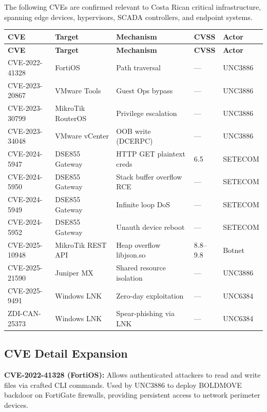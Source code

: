 \documentclass[11pt,a4paper]{article}
\begin{document}
The following CVEs are confirmed relevant to Costa Rican critical infrastructure, spanning edge devices, hypervisors, SCADA controllers, and endpoint systems.

\begin{longtable}{@{} p{2.5cm} p{2.2cm} p{4cm} p{1.5cm} p{2cm} @{}}
\toprule
\textbf{CVE} & \textbf{Target} & \textbf{Mechanism} & \textbf{CVSS} & \textbf{Actor} \\
\midrule
\endfirsthead
\toprule
\textbf{CVE} & \textbf{Target} & \textbf{Mechanism} & \textbf{CVSS} & \textbf{Actor} \\
\midrule
\endhead
CVE-2022-41328 & FortiOS & Path traversal & --- & UNC3886 \\
CVE-2023-20867 & VMware Tools & Guest Ops bypass & --- & UNC3886 \\
CVE-2023-30799 & MikroTik RouterOS & Privilege escalation & --- & UNC3886 \\
CVE-2023-34048 & VMware vCenter & OOB write (DCERPC) & --- & UNC3886 \\
CVE-2024-5947 & DSE855 Gateway & HTTP GET plaintext creds & 6.5 & SETECOM \\
CVE-2024-5950 & DSE855 Gateway & Stack buffer overflow RCE & --- & SETECOM \\
CVE-2024-5949 & DSE855 Gateway & Infinite loop DoS & --- & SETECOM \\
CVE-2024-5952 & DSE855 Gateway & Unauth device reboot & --- & SETECOM \\
CVE-2025-10948 & MikroTik REST API & Heap overflow libjson.so & 8.8--9.8 & Botnet \\
CVE-2025-21590 & Juniper MX & Shared resource isolation & --- & UNC3886 \\
CVE-2025-9491 & Windows LNK & Zero-day exploitation & --- & UNC6384 \\
ZDI-CAN-25373 & Windows LNK & Spear-phishing via LNK & --- & UNC6384 \\
\bottomrule
\end{longtable}

\subsection{CVE Detail Expansion}

\textbf{CVE-2022-41328 (FortiOS):} Allows authenticated attackers to read and write files via crafted CLI commands. Used by UNC3886 to deploy BOLDMOVE backdoor on FortiGate firewalls, providing persistent access to network perimeter devices.
\end{document}
